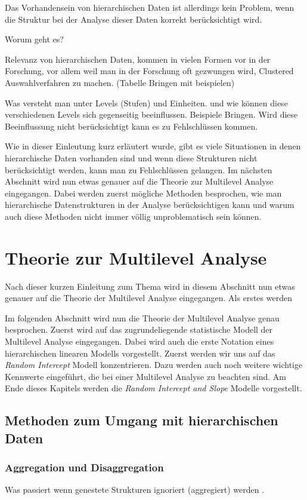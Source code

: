 \documentclass[12pt]{article}\usepackage[]{graphicx}\usepackage[]{color}
\begin{document}
Das Vorhandensein von hierarchischen Daten ist allerdings kein Problem, wenn die Struktur bei der Analyse dieser Daten korrekt berücksichtigt wird. 

Worum geht es?

Relevanz von hierarchischen Daten, kommen in vielen Formen vor in der Forschung, vor allem weil man in der Forschung oft gezwungen wird, Clustered Auswahlverfahren zu machen. (Tabelle Bringen mit beispielen)

Was versteht man unter Levels (Stufen) und Einheiten. und wie können diese verschiedenen Levels sich gegenseitig beeinflussen. Beispiele Bringen. 
Wird diese Beeinflussung nicht berücksichtigt kann es zu Fehlschlüssen kommen.

Wie in dieser Einleutung kurz erläutert wurde, gibt es viele Situationen in denen hierarchische Daten vorhanden sind und wenn diese Strukturen nicht berücksichtigt werden, kann man zu Fehlschlüssen gelangen. Im nächsten Abschnitt wird nun etwas genauer auf die Theorie zur Multilevel Analyse eingegangen. Dabei werden zuerst mögliche Methoden besprochen, wie man hierarchische Datenstrukturen in der Analyse berücksichtigen kann und warum auch diese Methoden nicht immer völlig unproblematisch sein können. 

\section{Theorie zur Multilevel Analyse}
Nach dieser kurzen Einleitung zum Thema wird in diesem Abschnitt nun etwas genauer auf die Theorie der Multilevel Analyse eingegangen. Als erstes werden 

Im folgenden Abschnitt wird nun die Theorie der Multilevel Analyse genau besprochen. Zuerst wird auf das zugrundeliegende statistische Modell der Multilevel Analyse eingegangen. Dabei wird auch die erste Notation eines hierarchischen linearen Modells vorgestellt. Zuerst werden wir uns auf das \textit{Random Intercept} Modell konzentrieren. Dazu werden auch noch weitere wichtige Kennwerte eingeführt, die bei einer Multilevel Analyse zu beachten sind. Am Ende dieses Kapitels werden die  \textit{Random Intercept and Slope} Modelle vorgestellt.

\subsection{Methoden zum Umgang mit hierarchischen Daten}

\subsubsection{Aggregation und Disaggregation}
Was passiert wenn genestete Strukturen ignoriert (aggregiert) werden \cite{SnijdersTomA.B2012Ma:a}.
\end{document}
